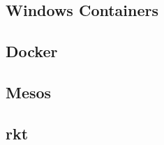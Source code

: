 \subsection{Windows Containers}
\label{sec:WindowsContainers}



\subsection{Docker}
\label{sec:Docker}



\subsection{Mesos}
\label{sec:Mesos}



\subsection{rkt}
\label{sec:rkt}



